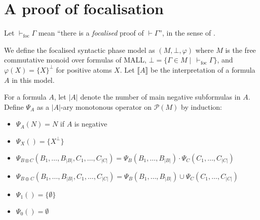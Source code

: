 \documentclass{article}
\author{Naïm Favier}
\newcommand\size[1]{{\lvert #1 \rvert}}
\newcommand\sem[1]{{\llbracket #1 \rrbracket}}
\newcommand\vdashfoc{\vdash_\text{foc}}
\begin{document}
\section{A proof of focalisation}

Let $\vdashfoc \Gamma$ mean ``there is a \textit{focalised} proof of $\vdash \Gamma$'', in the sense of \cite{laurent}.

We define the focalised syntactic phase model as $(M, \bot, \varphi)$ where $M$ is the free commutative monoid over formulas of MALL, $\bot = \{\Gamma \in M \mid\,\vdashfoc \Gamma\}$, and $\varphi(X) = \{X\}^\perp$ for positive atoms $X$. Let $\sem{A}$ be the interpretation of a formula $A$ in this model.

For a formula $A$, let $\size{A}$ denote the number of main negative subformulas in $A$. Define $\Psi_A$ as a $\size{A}$-ary monotonous operator on $\mathcal P(M)$ by induction:
\begin{itemize}
    \item $\Psi_A(N) = N$ if $A$ is negative
    \item $\Psi_X() = \{X^\perp\}$
    \item $\Psi_{B \otimes C}(B_1, \dots, B_\size{B}, C_1, \dots, C_\size{C}) = \Psi_B(B_1, \dots, B_\size{B}) \cdot \Psi_C(C_1, \dots, C_\size{C})$
    \item $\Psi_{B \oplus C}(B_1, \dots, B_\size{B}, C_1, \dots, C_\size{C}) = \Psi_B(B_1, \dots, B_\size{B}) \cup \Psi_C(C_1, \dots, C_\size{C})$
    \item $\Psi_1() = \{\emptyset\}$
    \item $\Psi_0() = \emptyset$
\end{itemize}
\end{document}
